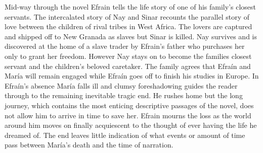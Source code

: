 \documentclass[12pt]{report}
\begin{document}
Mid-way through the novel Efrain tells the life story of one of his family’s closest servants.
The intercalated story of Nay and Sinar recounts the parallel story of love between the children of rival tribes in West Africa.
The lovers are captured and shipped off to New Granada as slaves but Sinar is killed.
Nay survives and is discovered at the home of a slave trader by Efrain’s father who purchases her only to grant her freedom.
However Nay stays on to become the families closest servant and the children’s beloved caretaker.
The family agrees that Efraín and María will remain engaged while Efraín goes off to finish his studies in Europe.
In Efraín's absence María falls ill and clumsy foreshadowing guides the reader through to the remaining inevitable tragic end.
He rushes home but the long journey, which contains the most enticing descriptive passages of the novel, does not allow him to arrive in time to save her.
Efrain mourns the loss as the world around him moves on finally acquiescent to the thought of ever having the life he dreamed of.
The end leaves little indication of what events or amount of time pass between María's death and the time of narration.
\end{document}
